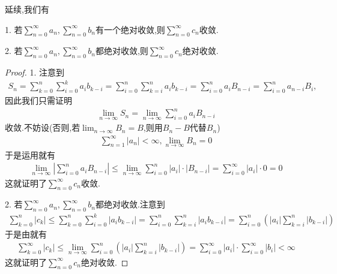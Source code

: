 \documentclass[../../main.tex]{subfiles}
\begin{document}
\begin{theorem}[Cauchy积收敛定理]\label{theorem:Cauchy积收敛定理}
延续,我们有

1. 若$\sum\limits_{n=0}^{\infty} a_n,\sum\limits_{n=0}^{\infty} b_n$有一个绝对收敛,则$\sum\limits_{n=0}^{\infty} c_n$收敛.

2. 若$\sum\limits_{n=0}^{\infty} a_n,\sum\limits_{n=0}^{\infty} b_n$都绝对收敛,则$\sum\limits_{n=0}^{\infty} c_n$绝对收敛.
\end{theorem}
\begin{proof}
1. 注意到
\begin{align*}
S_n = \sum\limits_{k=0}^{n} \sum\limits_{i=0}^{k} a_i b_{k-i} = \sum\limits_{i=0}^{n} \sum\limits_{k=i}^{n} a_i b_{k-i} = \sum\limits_{i=0}^{n} a_i B_{n-i} = \sum\limits_{i=0}^{n} a_{n-i} B_i,
\end{align*}
因此我们只需证明
\begin{align*}
\lim\limits_{n\to\infty} S_n = \lim\limits_{n\to\infty}\sum\limits_{i=0}^{n} a_i B_{n-i}
\end{align*}
收敛.不妨设(否则,若$\lim_{n\to\infty}B_n=B$,则用$B_n-B$代替$B_n$)
\begin{align*}
\sum\limits_{n=1}^{\infty} |a_n| < \infty,\lim\limits_{n\to\infty} B_n = 0
\end{align*}
于是运用就有
\begin{align*}
\lim\limits_{n\to\infty} \left| \sum\limits_{i=0}^{n} a_i B_{n-i} \right| \leqslant \lim\limits_{n\to\infty} \sum\limits_{i=0}^{n} |a_i| \cdot |B_{n-i}| = \sum\limits_{i=0}^{\infty} |a_i| \cdot 0 = 0
\end{align*}
这就证明了$\sum\limits_{n=0}^{\infty} c_n$收敛.

2. 若$\sum\limits_{n=0}^{\infty} a_n,\sum\limits_{n=0}^{\infty} b_n$都绝对收敛.注意到
\begin{align*}
\sum\limits_{k=0}^{n} |c_k| \leqslant \sum\limits_{k=0}^{n} \sum\limits_{i=0}^{k} |a_i b_{k-i}| = \sum\limits_{i=0}^{n} \sum\limits_{k=i}^{n} |a_i b_{k-i}| = \sum\limits_{i=0}^{n} \left( |a_i| \sum\limits_{k=i}^{n} |b_{k-i}| \right)
\end{align*}
于是由就有
\begin{align*}
\sum\limits_{k=0}^{\infty} |c_k| \leqslant \lim\limits_{n\to\infty} \sum\limits_{i=0}^{n} \left( |a_i| \sum\limits_{k=i}^{n} |b_{k-i}| \right) = \sum\limits_{i=0}^{\infty} |a_i| \cdot \sum\limits_{i=0}^{\infty} |b_i| < \infty
\end{align*}
这就证明了$\sum\limits_{n=0}^{\infty} c_n$绝对收敛.
\end{proof}
\end{document}
